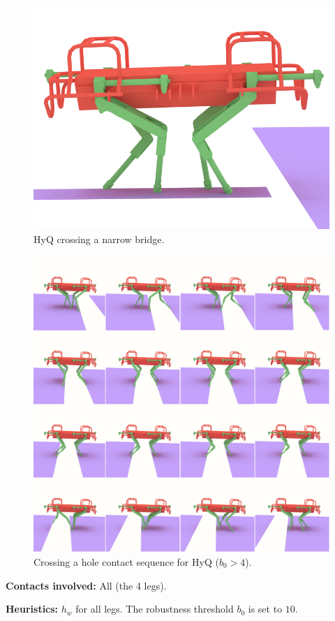 \begin{figure}
  \centering
  \includegraphics[width=0.4\linewidth]{figures/HyQ_bridge}
  \caption{
           HyQ crossing a narrow bridge. }
		   \label{fig:HyQ_bridge}
\end{figure}

\begin{figure}
  \centering
  \includegraphics[width=1\linewidth]{figures/HyQ_obs}
  \caption{
           Crossing a hole contact sequence for HyQ ($b_0 > 4$). }
		   \label{fig:HyQ_obs}
\end{figure}



\noindent\textbf{Contacts involved:} All (the 4 legs).

\noindent\textbf{Heuristics:} $h_w$ for all legs. The robustness threshold $b_0$ is set to $10$.


